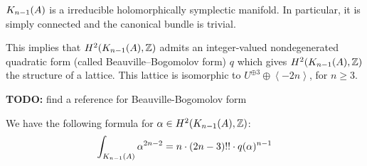 \begin{theorem}\cite[Th\'eor\`eme 4]{Beauville}
$\kum{A}{n-1}$ is a irreducible holomorphically symplectic manifold. In particular, it is simply connected and the canonical bundle is trivial.
\end{theorem}
This implies that $H^2(\kum{A}{n-1},\Z)$ admits an integer-valued nondegenerated quadratic form (called Beauville--Bogomolov form) $q$ which gives $H^2(\kum{A}{n-1},\Z)$ the structure of a lattice. This lattice is
isomorphic to $U^{\oplus 3}\oplus \left< -2n \right>$, for $n\geq 3$. 

\textbf{TODO:} find a reference for Beauville-Bogomolov form

We have the following formula for $\alpha\in H^2(\kum{A}{n-1},\Z)$:
\begin{equation} \label{fujiki}
\int_{\kum{A}{n-1}} \alpha^{2n-2} = n\cdot(2n-3)!!\cdot q(\alpha)^{n-1}
\end{equation}



